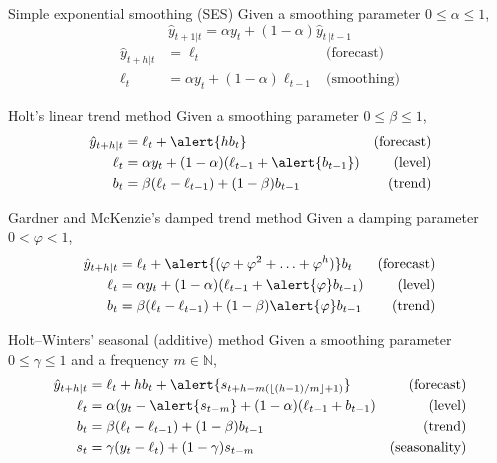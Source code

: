 \documentclass[12pt,aspectratio=169]{beamer}
\newcommand{\N}{\ensuremath{\mathbb{N}}}
\begin{document}
\begin{frame}{Simple exponential smoothing (SES)}
    Given a smoothing parameter $0 \leq \alpha \leq 1$,
    \[
        \hat{y}_{t + 1 | t} = \alpha y_{t} + (1 - \alpha) \hat{y}_{t\,| t - 1}
    \]
    \vfill
    \begin{align*}
        \hat{y}_{t + h | t} &= \ell_{t}                               & \text{(forecast)} \\
        \ell_{t}            &= \alpha y_{t} + (1 - \alpha) \ell_{t-1} & \text{(smoothing)}
    \end{align*}
\end{frame}

\begin{frame}{Holt's linear trend method}
    Given a smoothing parameter $0 \leq \beta \leq 1$,
    \begin{align*}
        \hat{y}_{t + h | t} &= \ell_{t} + \alert{h b_{t}}                                 & \text{(forecast)} \\
        \ell_{t}            &= \alpha y_{t} + (1 - \alpha) (\ell_{t-1} + \alert{b_{t-1}}) & \text{(level)} \\
        b_{t}               &= \beta (\ell_{t} - \ell_{t-1}) + (1 - \beta) b_{t-1}        & \text{(trend)}
    \end{align*}
\end{frame}

\begin{frame}{Gardner and McKenzie's damped trend method}
    Given a damping parameter $0 < \varphi < 1$,
    \begin{align*}
        \hat{y}_{t + h | t} &= \ell_{t} + \alert{(\varphi + \varphi^{2} + \ldots + \varphi^{h})} b_{t} & \text{(forecast)} \\
        \ell_{t}            &= \alpha y_{t} + (1 - \alpha) (\ell_{t-1} + \alert{\varphi} b_{t-1})      & \text{(level)} \\
        b_{t}               &= \beta (\ell_{t} - \ell_{t-1}) + (1 - \beta) \alert{\varphi} b_{t-1}     & \text{(trend)}
    \end{align*}
\end{frame}

\begin{frame}{Holt--Winters' seasonal (additive) method}
    Given a smoothing parameter $0 \leq \gamma \leq 1$ and a frequency $m \in \N$,
    \begin{align*}
        \hat{y}_{t + h | t} &= \ell_{t} + h b_{t} + \alert{s_{t+h-m(\lfloor (h-1)/m \rfloor+1)}}     & \text{(forecast)} \\
        \ell_{t}            &= \alpha (y_{t} - \alert{s_{t-m}} + (1 - \alpha) (\ell_{t-1} + b_{t-1}) & \text{(level)} \\
        b_{t}               &= \beta (\ell_{t} - \ell_{t-1}) + (1 - \beta) b_{t-1}                   & \text{(trend)} \\
        s_{t}               &= \gamma (y_{t} - \ell_{t}) + (1 - \gamma) s_{t-m}                      & \text{(seasonality)}
    \end{align*}
\end{frame}
\end{document}
